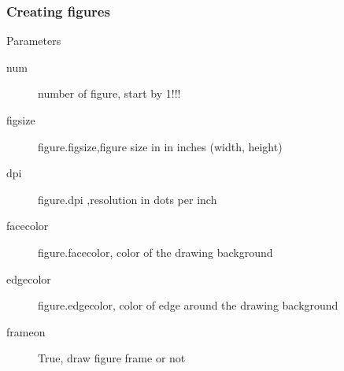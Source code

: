 \documentclass[colorlinks]{beamer}
\begin{document}
\begin{frame}[fragile]\frametitle{Creating figures}
\begin{block}{Parameters}
\begin{description}
    \item[num] number of figure, start by 1!!!
\item [figsize]	figure.figsize,figure size in in inches (width, height)
\item [dpi] figure.dpi ,resolution in dots per inch
\item [facecolor] figure.facecolor, color of the drawing background
\item [edgecolor] figure.edgecolor, color of edge around the drawing background
\item [frameon] True, draw figure frame or not 
\end{description}
\end{block}

\end{frame}
\end{document}
